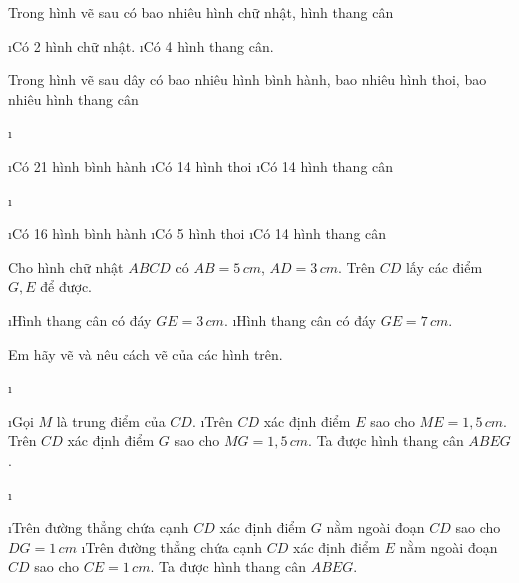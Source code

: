 \begin{bt}
	Trong hình vẽ sau có bao nhiêu hình chữ nhật, hình thang cân
	\begin{loigiaichuong35}
		\begin{enumerate}[--, leftmargin=*]
			\i Có 2 hình chữ nhật.
			\i Có 4 hình thang cân.
		\end{enumerate}
	\end{loigiaichuong35}
\end{bt}
\begin{bt}
	Trong hình vẽ sau dây có bao nhiêu hình bình hành, bao nhiêu hình thoi, bao nhiêu hình thang cân
	\begin{loigiaichuong35}
		\begin{enumerate}[a), leftmargin=*]
			\i \begin{enumerate}[--, leftmargin=*]
				\i Có 21 hình bình hành
				\i Có 14 hình thoi
				\i Có 14 hình thang cân
				\end{enumerate}
			\i \begin{enumerate}[--, leftmargin=*]
				\i Có 16 hình bình hành
				\i Có 5 hình thoi
				\i Có 14 hình thang cân
			\end{enumerate}
		\end{enumerate}
	\end{loigiaichuong35}
\end{bt}
\begin{bt}
	Cho hình chữ nhật $ABCD$ có $AB = 5 \,cm$, $AD = 3\, cm$. Trên $CD$ lấy các điểm $G, E$ để được.
	\begin{enumerate}[a), leftmargin=*]
		\i Hình thang cân có đáy $GE = 3\, cm$.
		\i Hình thang cân có đáy $GE = 7\, cm$. 
	\end{enumerate}
	Em hãy vẽ và nêu cách vẽ của các hình trên.
	\begin{loigiaichuong35}
		\begin{enumerate}[a), leftmargin=*]
			\i \begin{enumerate}[Bước 1:, leftmargin=*]
				\i Gọi $M$ là trung điểm của  $CD$. 
				\i Trên $CD$ xác định điểm $E$ sao cho $ME = 1,5\,cm$. Trên $CD$ xác định điểm $G$  sao cho $MG = 1,5\, cm$.  Ta được hình thang cân $ABEG$.
				\end{enumerate}
			\i \begin{enumerate}[Bước 1:, leftmargin=*]
				\i Trên đường thẳng chứa cạnh $CD$ xác định điểm $G$ nằm ngoài đoạn $CD$ sao cho $DG = 1\,cm$
				\i Trên đường thẳng chứa cạnh $CD$ xác định điểm $E$ nằm ngoài đoạn $CD$ sao cho $CE =1\, cm$. Ta được hình thang cân  $ABEG$.
			\end{enumerate}
		\end{enumerate}
	\end{loigiaichuong35}
\end{bt}
